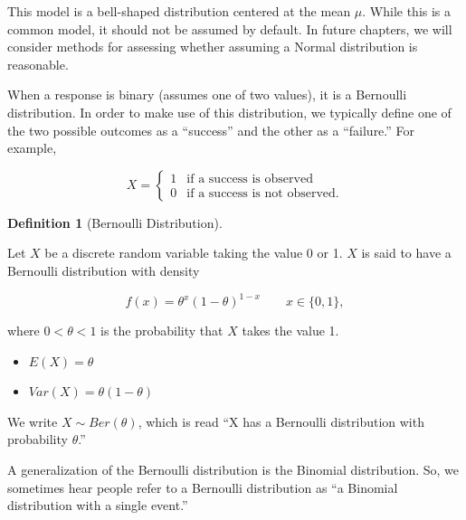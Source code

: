 \documentclass[
  letterpaper,
  DIV=11,
  numbers=noendperiod]{scrreprt}
\providecommand{\tightlist}{%
  \setlength{\itemsep}{0pt}\setlength{\parskip}{0pt}}\usepackage{longtable,booktabs,array}
\theoremstyle{definition}
\theoremstyle{definition}
\newtheorem{definition}{Definition}[chapter]
\theoremstyle{remark}
\begin{document}
This model is a bell-shaped distribution centered at the mean \(\mu\).
While this is a common model, it should not be assumed by default. In
future chapters, we will consider methods for assessing whether assuming
a Normal distribution is reasonable.

When a response is binary (assumes one of two values), it is a Bernoulli
distribution. In order to make use of this distribution, we typically
define one of the two possible outcomes as a ``success'' and the other
as a ``failure.'' For example,

\[X = \begin{cases} 1 & \text{if a success is observed} \\ 0 & \text{if a success is not observed.} \end{cases}\]

\begin{definition}[Bernoulli
Distribution]\protect\hypertarget{def-bernoulli-distribution}{}\label{def-bernoulli-distribution}

Let \(X\) be a discrete random variable taking the value 0 or 1. \(X\)
is said to have a Bernoulli distribution with density

\[f(x) = \theta^x (1 - \theta)^{1 - x} \qquad x \in \{0, 1\},\]

where \(0 < \theta < 1\) is the probability that \(X\) takes the value
1.

\begin{itemize}
\tightlist
\item
  \(E(X) = \theta\)
\item
  \(Var(X) = \theta(1 - \theta)\)
\end{itemize}

We write \(X \sim Ber(\theta)\), which is read ``X has a Bernoulli
distribution with probability \(\theta\).''

\end{definition}

\begin{tcolorbox}[enhanced jigsaw, bottomrule=.15mm, titlerule=0mm, bottomtitle=1mm, colback=white, coltitle=black, rightrule=.15mm, leftrule=.75mm, toprule=.15mm, toptitle=1mm, left=2mm, opacityback=0, colframe=quarto-callout-note-color-frame, breakable, title=\textcolor{quarto-callout-note-color}{\faInfo}\hspace{0.5em}{Note}, arc=.35mm, colbacktitle=quarto-callout-note-color!10!white, opacitybacktitle=0.6]

A generalization of the Bernoulli distribution is the Binomial
distribution. So, we sometimes hear people refer to a Bernoulli
distribution as ``a Binomial distribution with a single event.''

\end{tcolorbox}
\end{document}

